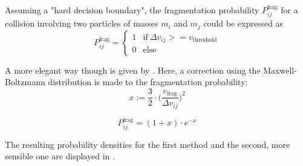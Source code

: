        Assuming a "hard decision boundary", the fragmentation probability $P^\text{frag}_{ij}$ 
        for a collision involving two particles of masses $m_i$ and $m_j$ could be expressed as
        \begin{equation}
            P^\text{frag}_{ij}
            =
            \begin{cases}
                1 & \text{if}\ \Delta v_{ij} >= v_\text{threshold}\\
                0 & \text{else}
            \end{cases}
        \end{equation}

        A more elegant way though is given by .
        Here, a correction using the Maxwell-Boltzmann distribution is made to the 
        fragmentation probability: 
        \begin{equation}
            x:=\frac{3}{2}\cdot\bigg(
                \frac{v_\text{frag}}{\Delta v_{ij}}
            \bigg)^2
        \end{equation}
        
        \begin{equation}
            P^\text{frag}_{ij}=(1+x)\cdot e^{-x}
        \end{equation}

        The resulting probability densities for the first method and the second, more sensible 
        one are displayed in .

        



        

